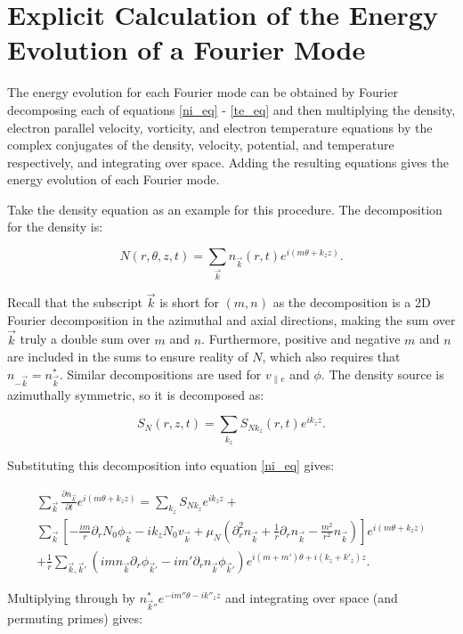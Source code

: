 \documentclass[showpacs,preprintnumbers,amsmath,amssymb,superscriptaddress,aip]{revtex4-1}
\def\beq{\begin{equation}}
\def\eeq{\end{equation}}
\def\beqar{\begin{eqnarray}}
\def\eeqar{\end{eqnarray}}
\newcommand{\pdiff}[2]{\frac{\partial#1}{\partial#2}}
\newcommand{\pdr}{\partial_r}
\newcommand{\pdrr}{\partial^2_r}
\newcommand{\vpe}{v_{\parallel e}}
\begin{document}
\appendix

\section{Explicit Calculation of the Energy Evolution of a Fourier Mode}

The energy evolution for each Fourier mode can be obtained by Fourier decomposing each of equations \ref{ni_eq} - \ref{te_eq}
and then multiplying the density, electron parallel velocity, vorticity, and electron temperature equations by the complex conjugates of the 
density, velocity, potential, and temperature respectively, and integrating over space.
Adding the resulting equations gives the energy evolution of each Fourier mode.

Take the density equation as an example for this procedure. The decomposition for the density is:

\beq
\label{density_decomp}
N(r,\theta,z,t) = \sum_{\vec{k}} n_{\vec{k}}(r,t) e^{i(m \theta + k_z z)}.
\eeq

Recall that the subscript $\vec{k}$ is short for $(m,n)$ as the decomposition is a 2D Fourier decomposition in the azimuthal and axial directions, making the sum over $\vec{k}$ truly
a double sum over $m$ and $n$. Furthermore, positive and negative
$m$ and $n$ are included in the sums to ensure reality of $N$, which also requires that $n_{-\vec{k}} = n_{\vec{k}}^*$.
Similar decompositions are used for $\vpe$ and $\phi$. The density source is azimuthally symmetric, so it is decomposed as:

\beq
\label{source_decomp}
S_N(r,z,t) = \sum_{k_z} S_{N k_z}(r,t) e^{i k_z z}.
\eeq

Substituting this decomposition into equation \ref{ni_eq} gives:

\beqar
\label{density_eq_fourier}
\sum_{\vec{k}} \pdiff{n_{\vec{k}}}{t} e^{i(m \theta + k_z z)} = \sum_{k_z} S_{N k_z} e^{i k_z z} + \nonumber \\
\sum_{\vec{k}} \left[ -\frac{i m}{r} \pdr N_0 \phi_{\vec{k}} - i k_z N_0 v_{\vec{k}} + \mu_N(\pdrr n_{\vec{k}} + \frac{1}{r} \pdr n_{\vec{k}} - \frac{m^2}{r^2} n_{\vec{k}}) \right] e^{i(m \theta + k_z z)} \nonumber \\
+ \frac{1}{r} \sum_{\vec{k},\vec{k}'} (i m n_{\vec{k}} \pdr \phi_{\vec{k}'} - i m' \pdr n_{\vec{k}} \phi_{\vec{k}'}) e^{i (m + m') \theta + i (k_z + k'_z) z}.
\eeqar

Multiplying through by $n_{\vec{k}''}^* e^{- i m'' \theta - i k''_z z}$ and integrating over space (and permuting primes) gives:
\end{document}
